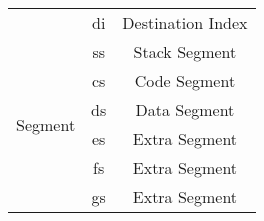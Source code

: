 \documentclass[11pt,a5paper,footinclude=true,headinclude=true]{scrbook} %
\begin{document}
\begin{center}
\begin{tabular}{|c|c|c|c|}
		\cline{2-4}
		                                  & \multicolumn{2}{c|}{\multirow{2}{*}{di}} & \multirow{2}{*}{Destination Index}\\
		                                  & \multicolumn{2}{c|}{}                    &\\
		\hline
		\multirow{6}{*}{Segment}          & \multicolumn{2}{c|}{ss}                  & Stack Segment\\
		\cline{2-4}
		                                  & \multicolumn{2}{c|}{cs}                  & Code Segment\\
		\cline{2-4}
		                                  & \multicolumn{2}{c|}{ds}                  & Data Segment\\
		\cline{2-4}
		                                  & \multicolumn{2}{c|}{es}                  & Extra Segment\\
		\cline{2-4}
		                                  & \multicolumn{2}{c|}{fs}                  & Extra Segment\\
		\cline{2-4}
		                                  & \multicolumn{2}{c|}{gs}                  & Extra Segment\\
		\hline
	\end{tabular}
\end{center}
\end{document}
